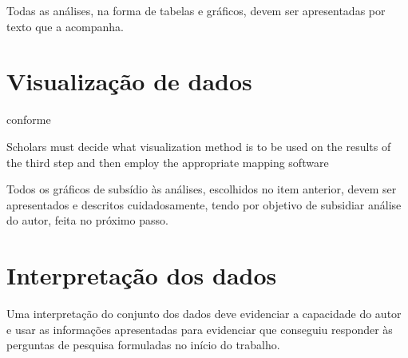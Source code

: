 Todas as análises, na forma de tabelas e gráficos, devem ser apresentadas por texto que a acompanha.

\section{Visualização de dados}

conforme \cite{aria_bibliometrix_2017}
\begin{itquote}
Scholars must decide what visualization method is to be used on the results of the
third step and then employ the appropriate mapping software    
\end{itquote}

Todos os gráficos de subsídio às análises, escolhidos no item anterior,  devem ser apresentados e descritos cuidadosamente, tendo por objetivo de subsidiar  análise do autor, feita no próximo passo. 

\section{Interpretação dos dados}

Uma interpretação do conjunto dos dados deve evidenciar a capacidade do autor e usar as informações apresentadas para evidenciar que conseguiu responder às perguntas de pesquisa formuladas no início do trabalho.


